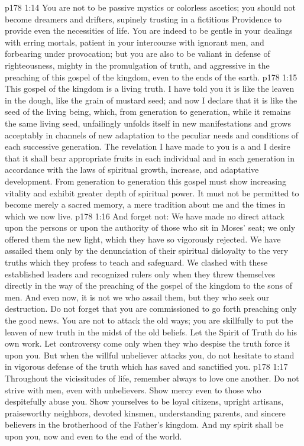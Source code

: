 \vs p178 1:14 You are not to be passive mystics or colorless ascetics; you should not become dreamers and drifters, supinely trusting in a fictitious Providence to provide even the necessities of life. You are indeed to be gentle in your dealings with erring mortals, patient in your intercourse with ignorant men, and forbearing under provocation; but you are also to be valiant in defense of righteousness, mighty in the promulgation of truth, and aggressive in the preaching of this gospel of the kingdom, even to the ends of the earth.
\vs p178 1:15 This gospel of the kingdom is a living truth. I have told you it is like the leaven in the dough, like the grain of mustard seed; and now I declare that it is like the seed of the living being, which, from generation to generation, while it remains the same living seed, unfailingly unfolds itself in new manifestations and grows acceptably in channels of new adaptation to the peculiar needs and conditions of each successive generation. The revelation I have made to you is a  and I desire that it shall bear appropriate fruits in each individual and in each generation in accordance with the laws of spiritual growth, increase, and adaptative development. From generation to generation this gospel must show increasing vitality and exhibit greater depth of spiritual power. It must not be permitted to become merely a sacred memory, a mere tradition about me and the times in which we now live.
\vs p178 1:16 And forget not: We have made no direct attack upon the persons or upon the authority of those who sit in Moses’ seat; we only offered them the new light, which they have so vigorously rejected. We have assailed them only by the denunciation of their spiritual disloyalty to the very truths which they profess to teach and safeguard. We clashed with these established leaders and recognized rulers only when they threw themselves directly in the way of the preaching of the gospel of the kingdom to the sons of men. And even now, it is not we who assail them, but they who seek our destruction. Do not forget that you are commissioned to go forth preaching only the good news. You are not to attack the old ways; you are skillfully to put the leaven of new truth in the midst of the old beliefs. Let the Spirit of Truth do his own work. Let controversy come only when they who despise the truth force it upon you. But when the willful unbeliever attacks you, do not hesitate to stand in vigorous defense of the truth which has saved and sanctified you.\plusone
\vs p178 1:17 Throughout the vicissitudes of life, remember always to love one another. Do not strive with men, even with unbelievers. Show mercy even to those who despitefully abuse you. Show yourselves to be loyal citizens, upright artisans, praiseworthy neighbors, devoted kinsmen, understanding parents, and sincere believers in the brotherhood of the Father’s kingdom. And my spirit shall be upon you, now and even to the end of the world.\plusone
